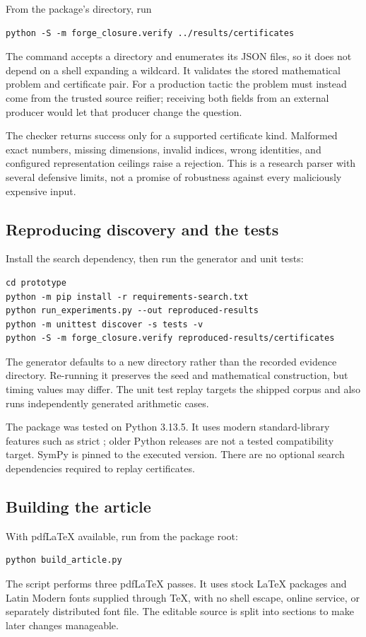 From the package's  directory, run
\begin{lstlisting}
python -S -m forge_closure.verify ../results/certificates
\end{lstlisting}
The command accepts a directory and enumerates its JSON files, so it does not depend on a shell expanding a wildcard. It validates the stored mathematical problem and certificate pair. For a production tactic the problem must instead come from the trusted source reifier; receiving both fields from an external producer would let that producer change the question.

The checker returns success only for a supported certificate kind. Malformed exact numbers, missing dimensions, invalid indices, wrong identities, and configured representation ceilings raise a rejection. This is a research parser with several defensive limits, not a promise of robustness against every maliciously expensive input.

\subsection{Reproducing discovery and the tests}

Install the search dependency, then run the generator and unit tests:
\begin{lstlisting}
cd prototype
python -m pip install -r requirements-search.txt
python run_experiments.py --out reproduced-results
python -m unittest discover -s tests -v
python -S -m forge_closure.verify reproduced-results/certificates
\end{lstlisting}
The generator defaults to a new  directory rather than the recorded evidence directory. Re-running it preserves the seed and mathematical construction, but timing values may differ. The unit test replay targets the shipped corpus and also runs independently generated arithmetic cases.

The package was tested on Python 3.13.5. It uses modern standard-library features such as strict ; older Python releases are not a tested compatibility target. SymPy is pinned to the executed version. There are no optional search dependencies required to replay certificates.

\subsection{Building the article}

With pdfLaTeX available, run from the package root:
\begin{lstlisting}
python build_article.py
\end{lstlisting}
The script performs three pdfLaTeX passes. It uses stock LaTeX packages and Latin Modern fonts supplied through TeX, with no shell escape, online service, or separately distributed font file. The editable source is split into sections to make later changes manageable.

